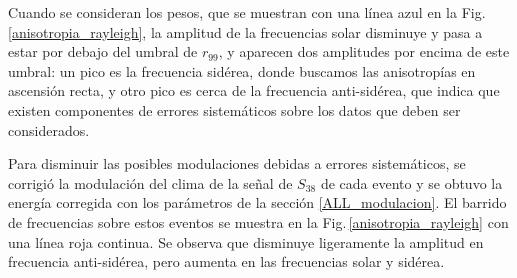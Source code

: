 Cuando se consideran los pesos, que se muestran con una línea azul en la Fig. \ref{anisotropia_rayleigh}, la amplitud de la frecuencias solar disminuye y pasa a estar por debajo del umbral de $r_{99}$, y aparecen dos amplitudes por encima de este umbral: un pico es la frecuencia sidérea, donde buscamos las anisotropías en ascensión recta, y otro pico es cerca de la frecuencia anti-sidérea, que indica que existen componentes de errores sistemáticos sobre los datos que deben ser considerados. 

Para disminuir las posibles modulaciones debidas a errores sistemáticos, se corrigió la modulación del clima de la  señal de $S_{38}$ de cada evento y se obtuvo la energía corregida con los parámetros de la sección \ref{ALL_modulacion}. El barrido de frecuencias sobre estos eventos se muestra en la Fig.\,\ref{anisotropia_rayleigh} con una línea roja continua. Se observa que disminuye ligeramente la amplitud en frecuencia anti-sidérea, pero aumenta en las frecuencias solar y sidérea.


